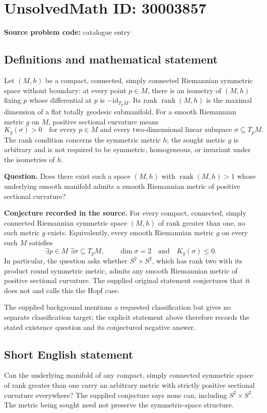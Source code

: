 \documentclass[11pt]{article}
\begin{document}
\section*{UnsolvedMath ID: 30003857}
\textbf{Source problem code:} catalogue entry
\subsection{Definitions and mathematical statement}
Let \((M,h)\) be a compact, connected, simply connected Riemannian symmetric space without boundary: at every point \(p\in M\), there is an isometry of \((M,h)\) fixing \(p\) whose differential at \(p\) is \(-\mathrm{id}_{T_pM}\). Its rank \(\operatorname{rank}(M,h)\) is the maximal dimension of a flat totally geodesic submanifold. For a smooth Riemannian metric \(g\) on \(M\), positive sectional curvature means
\[
K_g(\sigma)>0
\quad\text{for every }p\in M\text{ and every two-dimensional linear subspace }\sigma\subseteq T_pM.
\]
The rank condition concerns the symmetric metric \(h\); the sought metric \(g\) is arbitrary and is not required to be symmetric, homogeneous, or invariant under the isometries of \(h\).

\textbf{Question.} Does there exist such a space \((M,h)\) with \(\operatorname{rank}(M,h)>1\) whose underlying smooth manifold admits a smooth Riemannian metric of positive sectional curvature?

\textbf{Conjecture recorded in the source.} For every compact, connected, simply connected Riemannian symmetric space \((M,h)\) of rank greater than one, no such metric \(g\) exists. Equivalently, every smooth Riemannian metric \(g\) on every such \(M\) satisfies
\[
\exists p\in M\;\exists\sigma\subseteq T_pM,
\qquad \dim\sigma=2\quad\text{and}\quad K_g(\sigma)\leq 0.
\]
In particular, the question asks whether \(S^2\times S^2\), which has rank two with its product round symmetric metric, admits any smooth Riemannian metric of positive sectional curvature. The supplied original statement conjectures that it does not and calls this the Hopf case.

The supplied background mentions a requested classification but gives no separate classification target; the explicit statement above therefore records the stated existence question and its conjectured negative answer.
\subsection{Short English statement}
Can the underlying manifold of any compact, simply connected symmetric space of rank greater than one carry an arbitrary metric with strictly positive sectional curvature everywhere? The supplied conjecture says none can, including \(S^2\times S^2\). The metric being sought need not preserve the symmetric-space structure.
\end{document}
